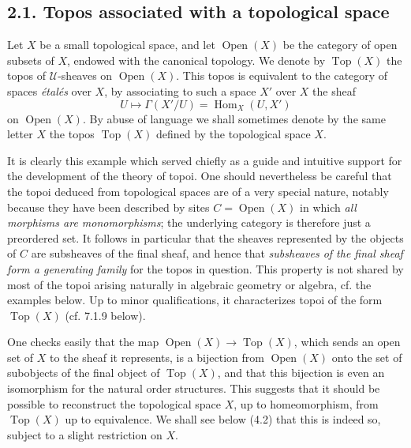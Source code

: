\documentclass[11pt]{article}
\newcommand{\U}{\mathcal{U}}
\newcommand{\Top}{\operatorname{Top}}
\newcommand{\Open}{\operatorname{Open}}
\newcommand{\Hom}{\operatorname{Hom}}
\begin{document}
\subsection*{2.1. Topos associated with a topological space}
Let \(X\) be a small topological space, and let \(\Open(X)\) be the category of open subsets of \(X\), endowed with the canonical topology. We denote by \(\Top(X)\) the topos of \(\U\)-sheaves on \(\Open(X)\). This topos is equivalent to the category of spaces \emph{\'etal\'es} over \(X\), by associating to such a space \(X'\) over \(X\) the sheaf
\[
U\longmapsto \Gamma(X'/U)=\Hom_X(U,X')
\]
on \(\Open(X)\). By abuse of language we shall sometimes denote by the same letter \(X\) the topos \(\Top(X)\) defined by the topological space \(X\).

It is clearly this example which served chiefly as a guide and intuitive support for the development of the theory of topoi. One should nevertheless be careful that the topoi deduced from topological spaces are of a very special nature, notably because they have been described by sites \(C=\Open(X)\) in which \emph{all morphisms are monomorphisms}; the underlying category is therefore just a preordered set. It follows in particular that the sheaves represented by the objects of \(C\) are subsheaves of the final sheaf, and hence that \emph{subsheaves of the final sheaf form a generating family} for the topos in question. This property is not shared by most of the topoi arising naturally in algebraic geometry or algebra, cf. the examples below. Up to minor qualifications, it characterizes topoi of the form \(\Top(X)\) (cf. 7.1.9 below).

One checks easily that the map \(\Open(X)\to\Top(X)\), which sends an open set of \(X\) to the sheaf it represents, is a bijection from \(\Open(X)\) onto the set of subobjects of the final object of \(\Top(X)\), and that this bijection is even an isomorphism for the natural order structures. This suggests that it should be possible to reconstruct the topological space \(X\), up to homeomorphism, from \(\Top(X)\) up to equivalence. We shall see below (4.2) that this is indeed so, subject to a slight restriction on \(X\).
\end{document}
